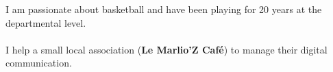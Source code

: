\documentclass[10pt,A4]{article}
\begin{document}
\begin{minipage}{0.59\textwidth}
{		%

		\parbox[b][3cm][c]{7cm}{
			\textcolor{textcol}{I am passionate about basketball and have been playing for 20 years at the departmental level.}
			\\
			\\
			\textcolor{textcol}{I help a small local association (\textbf{Le Marlio'Z Café}}) to manage their digital communication.
			\\
			\\
			\\
			\\
			\\
			\\
			\\
			
		}

		
	}
\end{minipage}
\begin{minipage}{0.05\textwidth}
	\begin{center}
	\end{center}
\end{minipage}
\end{document}
